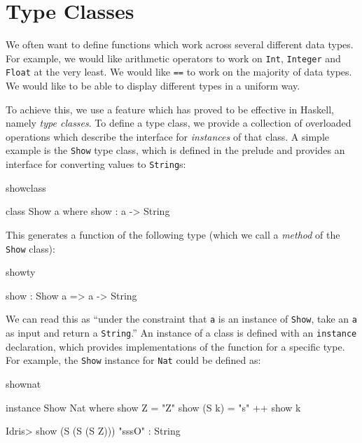\section{Type Classes}
\label{sec:classes}

We often want to define functions which work across several different data
types. For example, we would like arithmetic operators to work on \texttt{Int},
\texttt{Integer} and \texttt{Float} at the very least. We would like
\texttt{==} to work on the majority of data types. We would like to be able to
display different types in a uniform way.

To achieve this, we use a feature which has proved to be effective in Haskell, namely
\emph{type classes}. To define a type class, we provide a collection of overloaded
operations which describe the interface for \emph{instances} of that class. A simple example
is the \texttt{Show} type class, which is defined in the prelude and
provides an interface for converting values to
\texttt{String}s:

\begin{SaveVerbatim}{showclass}

class Show a where
    show : a -> String

\end{SaveVerbatim}

\noindent
This generates a function of the following type (which we call a \emph{method} of the 
\texttt{Show} class):

\begin{SaveVerbatim}{showty}

show : Show a => a -> String

\end{SaveVerbatim}

\noindent
We can read this as ``under the constraint that \texttt{a} is an instance of \texttt{Show},
take an \texttt{a} as input and return a \texttt{String}.'' An instance of a class
is defined with an \texttt{instance} declaration, which provides implementations of
the function for a specific type. For example, the \texttt{Show} instance for \texttt{Nat}
could be defined as:

\begin{SaveVerbatim}{shownat}

instance Show Nat where
    show Z = "Z"
    show (S k) = "s" ++ show k

Idris> show (S (S (S Z)))
"sssO" : String

\end{SaveVerbatim}

